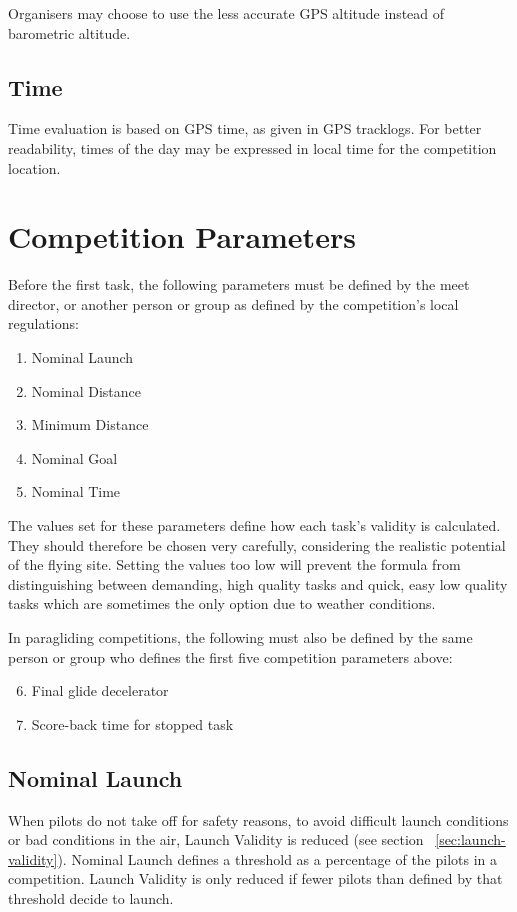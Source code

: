 \documentclass{article}
\begin{document}
Organisers may choose to use the less accurate GPS altitude instead of
barometric altitude.

\subsection{Time}
Time evaluation is based on GPS time, as given in GPS tracklogs. For better
readability, times of the day may be expressed in local time for the
competition location.

\newpage
\section{Competition Parameters}
Before the first task, the following parameters must be defined by the meet
director, or another person or group as defined by the competition’s local
regulations:
\begin{enumerate}
    \item Nominal Launch
    \item Nominal Distance
    \item Minimum Distance
    \item Nominal Goal
    \item Nominal Time
\end{enumerate}
The values set for these parameters define how each task’s validity is
calculated. They should therefore be chosen very carefully, considering the
realistic potential of the flying site. Setting the values too low will prevent
the formula from distinguishing between demanding, high quality tasks and
quick, easy low quality tasks which are sometimes the only option due to
weather conditions.

In paragliding competitions, the following must also be defined by the same
person or group who defines the first five competition parameters above:
\begin{enumerate}
    \setcounter{enumi}{5}
    \item Final glide decelerator
    \item Score-back time for stopped task
\end{enumerate}

\subsection{Nominal Launch}
When pilots do not take off for safety reasons, to avoid difficult launch
conditions or bad conditions in the air, Launch Validity is reduced (see
section ~\ref{sec:launch-validity}). Nominal Launch defines a threshold as a percentage of the pilots
in a competition. Launch Validity is only reduced if fewer pilots than defined
by that threshold decide to launch.
\end{document}
